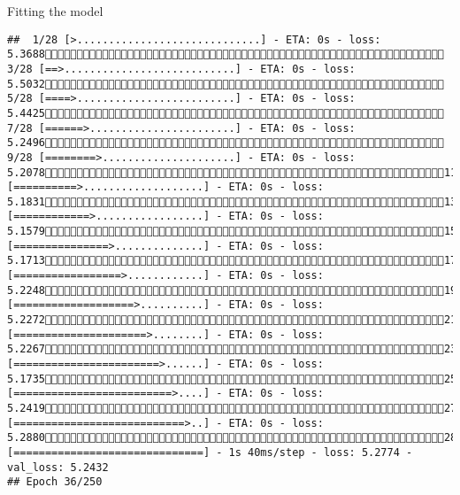 \documentclass[
  ignorenonframetext,
]{beamer}
\begin{document}
\begin{frame}[fragile]{Fitting the model}
\begin{verbatim}
##  1/28 [>.............................] - ETA: 0s - loss: 5.3688 3/28 [==>...........................] - ETA: 0s - loss: 5.5032 5/28 [====>.........................] - ETA: 0s - loss: 5.4425 7/28 [======>.......................] - ETA: 0s - loss: 5.2496 9/28 [========>.....................] - ETA: 0s - loss: 5.207811/28 [==========>...................] - ETA: 0s - loss: 5.183113/28 [============>.................] - ETA: 0s - loss: 5.157915/28 [===============>..............] - ETA: 0s - loss: 5.171317/28 [=================>............] - ETA: 0s - loss: 5.224819/28 [===================>..........] - ETA: 0s - loss: 5.227221/28 [=====================>........] - ETA: 0s - loss: 5.226723/28 [=======================>......] - ETA: 0s - loss: 5.173525/28 [=========================>....] - ETA: 0s - loss: 5.241927/28 [===========================>..] - ETA: 0s - loss: 5.288028/28 [==============================] - 1s 40ms/step - loss: 5.2774 - val_loss: 5.2432
## Epoch 36/250

\end{verbatim}
\end{frame}
\end{document}
